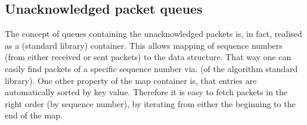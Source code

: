 \subsection{Unacknowledged packet queues}
The concept of queues containing the unacknowledged packets is, in fact, realised as a  (standard library) container. This allows mapping of sequence numbers (from either received or sent packets) to the  data structure. That way one can easily find packets of a specific sequence number via.  (of the algorithm standard library). One other property of the map container is, that entries are automatically sorted by key value. Therefore it is easy to fetch packets in the right order (by sequence number), by iterating from either the beginning to the end of the map.
